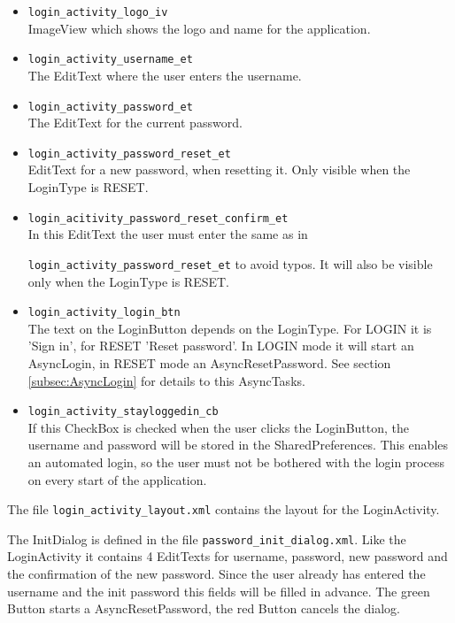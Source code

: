 \documentclass[12pt,a4paper,oneside]{report}
\newcommand{\code}[1]{\lstinline{#1}}
\begin{document}
\begin{itemize}
\item \code{login_activity_logo_iv}\\
ImageView which shows the logo and name for the application.

\item \code{login_activity_username_et}\\
The EditText where the user enters the username.

\item \code{login_activity_password_et}\\
The EditText for the current password.

\item \code{login_activity_password_reset_et}\\
EditText for a new password, when resetting it. Only visible when the LoginType is RESET.

\item \code{login_acitivity_password_reset_confirm_et}\\
In this EditText the user must enter the same as in

\code{login_activity_password_reset_et} to avoid typos. It will also be visible only when the LoginType is RESET.

\item \code{login_activity_login_btn}\\
The text on the LoginButton depends on the LoginType. For LOGIN it is 'Sign in', for RESET 'Reset password'. In LOGIN mode it will start an AsyncLogin, in RESET mode an AsyncResetPassword. See section \ref{subsec:AsyncLogin} for details to this AsyncTasks.

\item \code{login_activity_stayloggedin_cb}\\
If this CheckBox is checked when the user clicks the LoginButton, the username and password will be stored in the SharedPreferences. This enables an automated login, so the user must not be bothered with the login process on every start of the application.
\end{itemize}

The file \code{login_activity_layout.xml} contains the layout for the LoginActivity. 

The InitDialog is defined in the file \code{password_init_dialog.xml}. Like the LoginActivity it contains 4 EditTexts for username, password, new password and the confirmation of the new password. Since the user already has entered the username and the init password this fields will be filled in advance. The green Button starts a AsyncResetPassword, the red Button cancels the dialog. 
\end{document}
